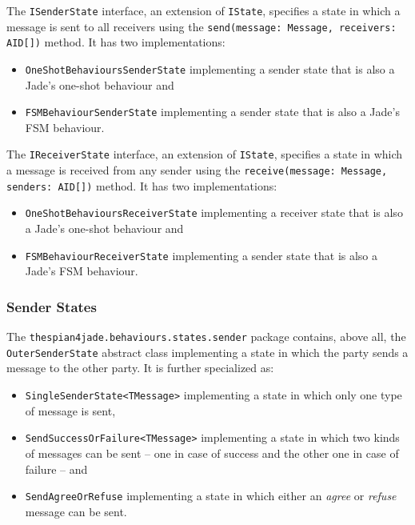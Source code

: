 The \texttt{ISenderState} interface, an extension of \texttt{IState}, specifies a state in which a message is sent to all receivers using the \texttt{send(message: Message, receivers: AID[])} method.
It has two implementations:
\begin{itemize}
	\item \texttt{OneShotBehavioursSenderState} implementing a sender state that is also a Jade's one-shot behaviour and
	\item \texttt{FSMBehaviourSenderState} implementing a sender state that is also a Jade's FSM behaviour.
\end{itemize}

The \texttt{IReceiverState} interface, an extension of \texttt{IState}, specifies a state in which a message is received from any sender using the \texttt{receive(message: Message, senders: AID[])} method.
It has two implementations:
\begin{itemize}
	\item \texttt{OneShotBehavioursReceiverState} implementing a receiver state that is also a Jade's one-shot behaviour and
	\item \texttt{FSMBehaviourReceiverState} implementing a sender state that is also a Jade's FSM behaviour.
\end{itemize}

\subsubsection*{Sender States}

The \texttt{thespian4jade.behaviours.states.sender} package contains, above all, the \texttt{OuterSenderState} abstract class implementing a state in which the party sends a message to the other party.
It is further specialized as:
\begin{itemize}
	\item \texttt{SingleSenderState<TMessage>} implementing a state in which only one type of message is sent,
	\item \texttt{SendSuccessOrFailure<TMessage>} implementing a state in which two kinds of messages can be sent -- one in case of success and the other one in case of failure -- and 
	\item \texttt{SendAgreeOrRefuse} implementing a state in which either an \textit{agree} or \textit{refuse} message can be sent.
\end{itemize}

